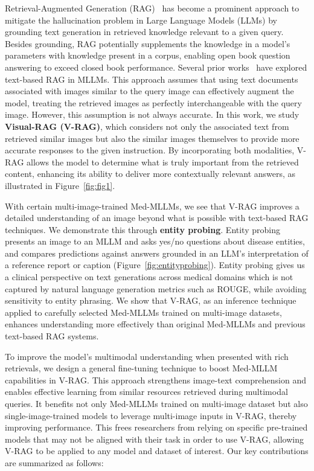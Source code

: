 Retrieval-Augmented Generation (RAG)~\cite{Lewis2020RetrievalAugmentedGF} has become a prominent approach to mitigate the hallucination problem in Large Language Models (LLMs) by grounding text generation in retrieved knowledge relevant to a given query. 
Besides grounding, RAG potentially supplements the knowledge in a model's parameters with knowledge present in a corpus, enabling open book question answering to exceed closed book performance.
Several prior works~\cite{Sarto2024TowardsRA,Liu2024RARRA, Zhou2024Img2LocRI} have explored text-based RAG in MLLMs.
This approach assumes that using text documents associated with images similar to the query image can effectively augment the model, treating the retrieved images as perfectly interchangeable with the query image.
However, this assumption is not always accurate. In this work, we study \textbf{Visual-RAG (V-RAG)}, which considers not only the associated text from retrieved similar images but also the similar images themselves to provide more accurate responses to the given instruction. By incorporating both modalities, V-RAG allows the model to determine what is truly important from the retrieved content, enhancing its ability to deliver more contextually relevant answers, as illustrated in Figure~\ref{fig:fig1}.

With certain multi-image-trained Med-MLLMs, we see that V-RAG improves a detailed understanding of an image beyond what is possible with text-based RAG techniques.
We demonstrate this through \textbf{entity probing}.
Entity probing presents an image to an MLLM and asks yes/no questions about disease entities, and compares predictions against answers grounded in an LLM's interpretation of a reference report or caption (Figure~\ref{fig:entityprobing}).
Entity probing gives us a clinical perspective on text generations across medical domains which is not captured by natural language generation metrics such as ROUGE, while avoiding sensitivity to entity phrasing.
We show that V-RAG, as an inference technique applied to carefully selected Med-MLLMs trained on multi-image datasets, enhances understanding more effectively than original Med-MLLMs and previous text-based RAG systems.


To improve the model's multimodal understanding when presented with rich retrievals, we design a general fine-tuning technique to boost Med-MLLM capabilities in V-RAG. 
This approach strengthens image-text comprehension and enables effective learning from similar resources retrieved during multimodal queries.
It benefits not only Med-MLLMs trained on multi-image dataset but also single-image-trained models to leverage multi-image inputs in V-RAG, thereby improving performance.
This frees researchers from relying on specific pre-trained models that may not be aligned with their task in order to use V-RAG, allowing V-RAG to be applied to any model and dataset of interest.  
Our key contributions are summarized as follows: 

